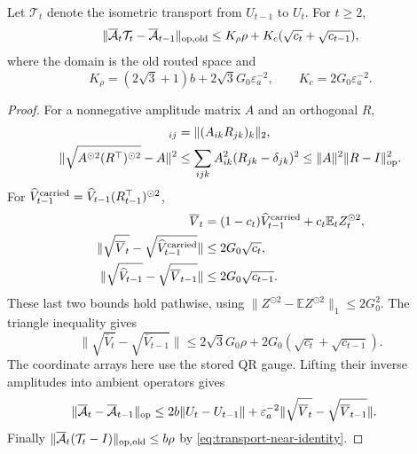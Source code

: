 \begin{lemma}
\label{lem:metric-variation}
Let $\mathcal T_t$ denote the isometric transport from $U_{t-1}$ to $U_t$.
For $t\ge2$,
\begin{equation}
 \|\overline{\mathcal A}_t\mathcal T_t
          -\overline{\mathcal A}_{t-1}\|_{\rm op,old}
 \le K_\rho\rho+K_c(\sqrt{c_t}+\sqrt{c_{t-1}}),\label{eq:metric-variation}
\end{equation}
where the domain is the old routed space and
\begin{equation}
 K_\rho=(2\sqrt3+1)b+2\sqrt3G_0\varepsilon_a^{-2},\qquad
 K_c=2G_0\varepsilon_a^{-2}.
\end{equation}
\end{lemma}
\begin{proof}
For a nonnegative amplitude matrix $A$ and an orthogonal $R$,
\begin{align}
 [\sqrt{A^{\odot2}(R^\top)^{\odot2}}]_{ij}
 &=\|(A_{ik}R_{jk})_k\|_2,\\
 \|\sqrt{A^{\odot2}(R^\top)^{\odot2}}-A\|^2
 &\le\sum_{ijk}A_{ik}^2(R_{jk}-\delta_{jk})^2
 \le\|A\|^2\|R-I\|_{\rm op}^2.
\end{align}
For $\widehat V_{t-1}^{\rm carried}
=\widehat V_{t-1}(R_{t-1}^\top)^{\odot2}$,
\begin{align}
 \overline V_t
 &=(1-c_t)\widehat V_{t-1}^{\rm carried}
                       +c_t\mathbb E_tZ_t^{\odot2},\\
 \|\sqrt{\overline V_t}
       -\sqrt{\widehat V_{t-1}^{\rm carried}}\|
 &\le2G_0\sqrt{c_t},\\
 \|\sqrt{\widehat V_{t-1}}-\sqrt{\overline V_{t-1}}\|
 &\le2G_0\sqrt{c_{t-1}}.
\end{align}
These last two bounds hold pathwise, using
$\|Z^{\odot2}-\mathbb E Z^{\odot2}\|_1\le2G_0^2$.
The triangle inequality gives
\begin{equation}
 \|\sqrt{\overline V_t}-\sqrt{\overline V_{t-1}}\|
 \le2\sqrt3G_0\rho+2G_0(\sqrt{c_t}+\sqrt{c_{t-1}}).
\end{equation}
The coordinate arrays here use the stored QR gauge. Lifting their inverse
amplitudes into ambient operators gives
\begin{align}
 \|\overline{\mathcal A}_t
       -\overline{\mathcal A}_{t-1}\|_{\rm op}
 &\le2b\|U_t-U_{t-1}\|
       +\varepsilon_a^{-2}
          \|\sqrt{\overline V_t}-\sqrt{\overline V_{t-1}}\|.
\end{align}
Finally $\|\overline{\mathcal A}_t(\mathcal T_t-I)\|_{\rm op,old}
\le b\rho$ by \eqref{eq:transport-near-identity}.
\end{proof}

